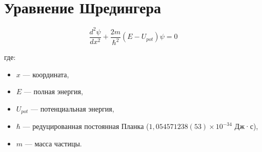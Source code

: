 \documentclass[a4paper, 12pt]{article}
\begin{document}
\section*{Уравнение Шредингера}

\begin{equation}
\frac{d^2 \psi}{dx^2} + \frac{2m}{\hbar^2} \left( E - U_{pot} \right) \psi = 0
\end{equation}

где:

\begin{itemize}
    \item \( x \) — координата,
    \item \( E \) — полная энергия,
    \item \( U_{pot} \) — потенциальная энергия,
    \item \( \hbar \) — редуцированная постоянная Планка (\( 1,054571238(53) \times 10^{-34} \) Дж·с),
    \item \( m \) — масса частицы.
\end{itemize}
\end{document}

